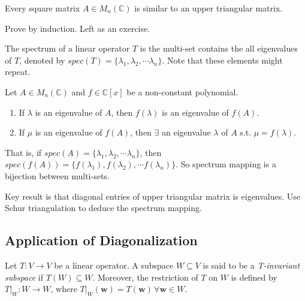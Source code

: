 \documentclass[12pt]{article}
\begin{document}
\begin{theorem}
    Every square matrix $A\in M_n(\mathbb{C})$ is similar to an upper triangular matrix.
\end{theorem}

\begin{pfbox}
    Prove by induction. Left as an exercise.
\end{pfbox}


\begin{definition}[Spectrum]
    The spectrum of a linear operator $T$ is the multi-set contains the all eigenvalues of $T$,
    denoted by $spec(T)=\{\lambda_1,\lambda_2,\cdots\lambda_n\}$. Note that these elements might repeat.
\end{definition}

\begin{theorem}
    Let $A\in M_n(\mathbb{C})$ and $f\in\mathbb{C}[x]$ be a non-constant polynomial. 
    \begin{enumerate}
        \item If $\lambda$ is an eigenvalue of $A$, then $f(\lambda)$ is an eigenvalue of $f(A)$.
        \item If $\mu$ is an eigenvalue of $f(A)$, then $\exists$ an eigenvalue $\lambda$ of $A$ s.t. $\mu=f(\lambda)$.
    \end{enumerate}
   That is, if  $spec(A)=\{\lambda_1,\lambda_2,\cdots\lambda_n\}$, then
    $spec(f(A))=\{f(\lambda_1),f(\lambda_2),\cdots f(\lambda_n)\}$.
    So spectrum mapping is a bijection between multi-sets. 
\end{theorem}

\begin{pfbox}
    Key result is that diagonal entries of upper triangular matrix is eigenvalues. Use Schur triangulation to deduce the spectrum mapping.
\end{pfbox}


\subsection*{Application of Diagonalization}
\begin{definition}
    Let $T:V\rightarrow V$ be a linear operator. A subspace $W\subseteq V$ is said to be a \emph{T-invariant subspace} if $T(W)\subseteq W$.
    Moreover, the restriction of $T$ on $W$ is defined by $T|_{W}:W\rightarrow W$, where $T|_{W}(\mathbf{w})=T(\mathbf{w})\,\forall \mathbf{w}\in W$.
\end{definition}
\end{document}
